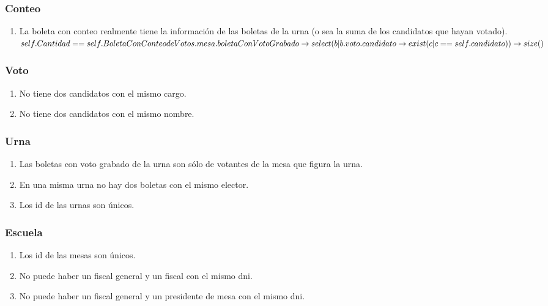 \subsubsection*{Conteo}

\begin{enumerate}

\item La boleta con conteo realmente tiene la información de las boletas de la urna (o sea la suma de los candidatos que hayan votado).
$self.Cantidad == \\
self.BoletaConConteodeVotos.mesa.boletaConVotoGrabado \rightarrow \\
select(b | b.voto.candidato  \rightarrow exist(c | c==self.candidato)) \rightarrow size() $
\end{enumerate}

\subsubsection*{Voto}
\begin{enumerate}
\item No tiene dos candidatos con el mismo cargo.

\item No tiene dos candidatos con el mismo nombre.
\end{enumerate}

\subsubsection*{Urna}
\begin{enumerate}
\item Las boletas con voto grabado de la urna son sólo de votantes de la mesa que figura la urna.
\item En una misma urna no hay dos boletas con el mismo elector.    
\item Los id de las urnas son únicos.
\end{enumerate}

\subsubsection*{Escuela}
\begin{enumerate}
\item Los id de las mesas son únicos.
\item No puede haber un fiscal general y un fiscal con el mismo dni.
\item No puede haber un fiscal general y un presidente de mesa con el mismo dni.
\end{enumerate}

